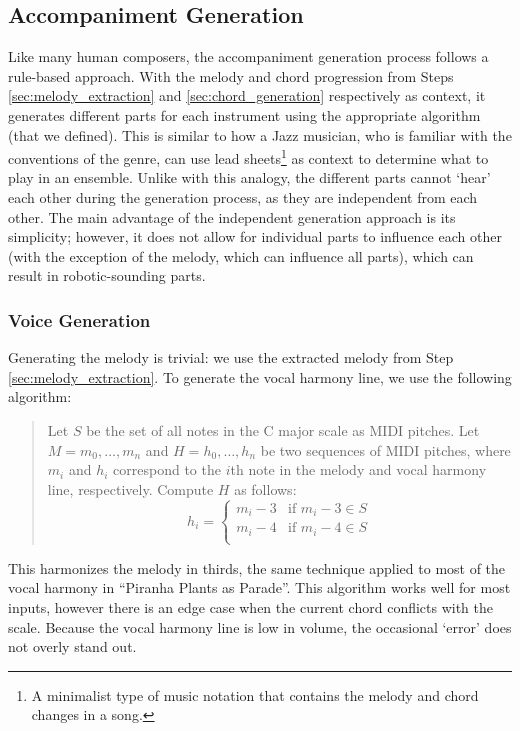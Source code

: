 \subsection{Accompaniment Generation}
\label{sec:accompaniment_generation}

Like many human composers, the accompaniment generation process follows a rule-based approach. With the melody and chord progression from Steps \ref{sec:melody_extraction} and \ref{sec:chord_generation} respectively as context, it generates different parts for each instrument using the appropriate algorithm (that we defined). This is similar to how a Jazz musician, who is familiar with the conventions of the genre, can use lead sheets\footnote{A minimalist type of music notation that contains the melody and chord changes in a song.} as context to determine what to play in an ensemble. Unlike with this analogy, the different parts cannot `hear' each other during the generation process, as they are independent from each other. The main advantage of the independent generation approach is its simplicity; however, it does not allow for individual parts to influence each other (with the exception of the melody, which can influence all parts), which can result in robotic-sounding parts.

\subsubsection{Voice Generation}

Generating the melody is trivial: we use the extracted melody from Step \ref{sec:melody_extraction}. To generate the vocal harmony line, we use the following algorithm:
\begin{quote}
    Let $S$ be the set of all notes in the C major scale as MIDI pitches. Let $M = m_0, \ldots, m_n$ and $H = h_0, \ldots, h_n$ be two sequences of MIDI pitches, where $m_i$ and $h_i$ correspond to the $i$th note in the melody and vocal harmony line, respectively. Compute $H$ as follows:
    $$h_i = \begin{cases}
        m_i - 3 & \text{if }m_i - 3 \in S \\
        m_i - 4 & \text{if }m_i - 4 \in S \\
    \end{cases}$$
\end{quote}
This harmonizes the melody in thirds, the same technique applied to most of the vocal harmony in ``Piranha Plants as Parade''. This algorithm works well for most inputs, however there is an edge case when the current chord conflicts with the scale. Because the vocal harmony line is low in volume, the occasional `error' does not overly stand out.

